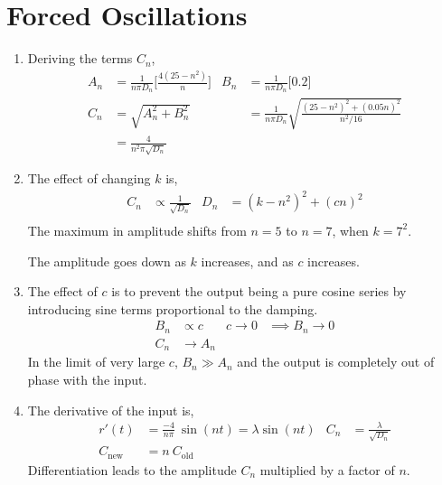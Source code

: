 \section{Forced Oscillations}

\begin{enumerate}
    \item Deriving the terms $ C_n $,
          \begin{align}
              A_n & = \frac{1}{n\pi D_n} \Bigg[ \frac{4(25 - n^2)}{n} \Bigg] &
              B_n & = \frac{1}{n\pi D_n} \Bigg[ 0.2 \Bigg]                     \\
              C_n & = \sqrt{A_n^2 + B_n^2}                                   &
                  & = \frac{1}{n\pi D_n}\sqrt{\frac{(25 - n^2)^2
              + (0.05n)^2}{n^2/16}}                                            \\
                  & = \frac{4}{n^2 \pi \sqrt{D_n}}
          \end{align}

    \item The effect of changing $ k $ is,
          \begin{align}
              C_n & \propto \frac{1}{\sqrt{D_n}} &
              D_n & = (k - n^2)^2 + (cn)^2         \\
          \end{align}
          The maximum in amplitude shifts from $ n = 5 $ to $ n = 7 $, when $ k = 7^2 $.
          \par The amplitude goes down as $ k $ increases, and as $ c $ increases.

    \item The effect of $ c $ is to prevent the output being a pure cosine series by
          introducing sine terms proportional to the damping.
          \begin{align}
              B_n     & \propto c          &
              c \to 0 & \implies B_n \to 0   \\
              C_n     & \to A_n
          \end{align}
          In the limit of very large $ c $, $ B_n \gg  A_n $ and the output is completely
          out of phase with the input.

    \item The derivative of the input is,
          \begin{align}
              r'(t)          & = \frac{-4}{n\pi}\ \sin(nt) = \lambda \sin(nt) &
              C_n            & = \frac{\lambda}{\sqrt{D_n}}                     \\
              C_{\text{new}} & = n\ C_{\text{old}}
          \end{align}
          Differentiation leads to the amplitude $ C_n $  multiplied by a factor of
          $ n $.


\end{enumerate}
